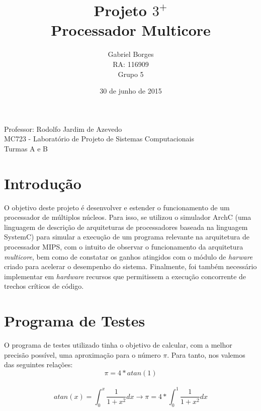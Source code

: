 \documentclass[11pt, a4paper]{article}
\begin{document}
\begin{titlepage}

\title{\vspace*{4cm}\textbf{Projeto $3^{+}$ \\ Processador Multicore}\vspace{1cm}}
\author{Gabriel Borges \\ RA: 116909 \\ Grupo 5}
\date{30 de junho de 2015}
\clearpage\maketitle

\tableofcontents
\thispagestyle{empty}

\vspace*{\fill}

\begin{center}
Professor: Rodolfo Jardim de Azevedo \\
MC723 - Laboratório de Projeto de Sistemas Computacionais \\
Turmas A e B
\end{center}

\end{titlepage}

\newpage

\section{Introdução}

O objetivo deste projeto é desenvolver e estender o funcionamento de um processador de múltiplos núcleos. Para isso, se utilizou o simulador ArchC (uma linguagem de descrição de arquiteturas de processadores baseada na linguagem SystemC) para simular a execução de um programa relevante na arquitetura de processador MIPS, com o intuito de observar o funcionamento da arquitetura \textit{multicore}, bem como de constatar os ganhos atingidos com o módulo de \textit{harware} criado para acelerar o desempenho do sistema. Finalmente, foi também necessário implementar em \textit{hardware} recursos que permitissem a execução concorrente de trechos críticos de código.

\section{Programa de Testes}

O programa de testes utilizado tinha o objetivo de calcular, com a melhor precisão possível, uma aproximação para o número $\pi$. Para tanto, nos valemos das seguintes relações: \\
\begin{equation}
\pi = 4 * atan(1)
\end{equation}
\\
\begin{equation}
atan(x) = \int_{0}^{x} \frac{1}{1+x^2} dx \rightarrow \pi = 4 * \int_{0}^{1} \frac{1}{1+x^2} dx  
\end{equation}
\end{document}
